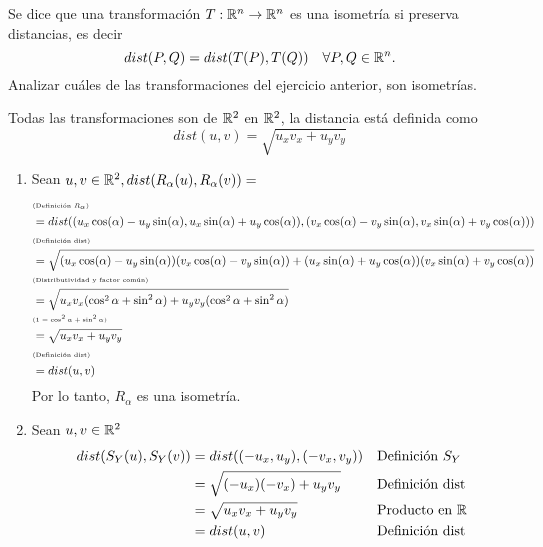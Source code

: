 \item Se dice que una transformación $T:\mathbb{R}^n\to\mathbb{R}^n$ es una isometría si preserva distancias, es decir\[dist(P,Q)=dist(T(P),T(Q))\quad\forall P,Q\in\mathbb{R}^n.\] Analizar cuáles de las transformaciones del ejercicio anterior, son isometrías.
    \begin{mdframed}[style=s]
        Todas las transformaciones son de $\mathbb{R}^2$ en $\mathbb{R}^2$, la distancia está definida como \[dist(u,v)=\sqrt{u_xv_x+u_yv_y}\]
        \begin{enumerate}
            \item Sean $u,v\in\mathbb{R}^2,dist(R_\alpha(u),R_\alpha(v))=$
                \begin{align*}
                    &\text{\tiny(Definición $R_\alpha$)}\\
                    &=dist((u_x\cos(\alpha)-u_y\sin(\alpha),u_x\sin(\alpha)+u_y\cos(\alpha)),(v_x\cos(\alpha)-v_y\sin(\alpha),v_x\sin(\alpha)+v_y\cos(\alpha)))\\
                    &\text{\tiny(Definición dist)}\\
                    &=\sqrt{(u_x\cos(\alpha)-u_y\sin(\alpha))(v_x\cos(\alpha)-v_y\sin(\alpha))+(u_x\sin(\alpha)+u_y\cos(\alpha))(v_x\sin(\alpha)+v_y\cos(\alpha))}\\
                    &\text{\tiny(Distributividad y factor común)}\\
                    &=\sqrt{u_xv_x(\cos^2\alpha+\sin^2\alpha)+u_yv_y(\cos^2\alpha+\sin^2\alpha)}\\
                    &\text{\tiny($1=\cos^2\alpha+\sin^2\alpha$)}\\
                    &=\sqrt{u_xv_x+u_yv_y}\\
                    &\text{\tiny(Definición dist)}\\
                    &=dist(u,v)
                \end{align*}
                Por lo tanto, $R_\alpha$ es una isometría.
            \item Sean $u,v\in\mathbb{R}^2$
                \begin{align*}
                    dist(S_Y(u),S_Y(v))&=dist((-u_x,u_y),(-v_x,v_y))&&\text{Definición }S_Y\\
                    &=\sqrt{(-u_x)(-v_x)+u_yv_y}&&\text{Definición dist}\\
                    &=\sqrt{u_xv_x+u_yv_y}&&\text{Producto en }\mathbb{R}\\
                    &=dist(u,v)&&\text{Definición dist}
                \end{align*}

\end{enumerate}
\end{mdframed}
